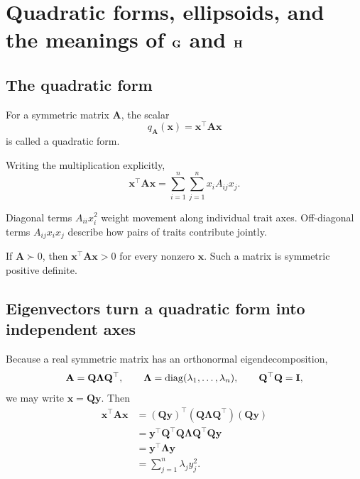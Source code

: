 \chapter{Quadratic forms, ellipsoids, and the meanings of \(\mathbf{G}\) and \(\mathbf{H}\)}

\section{The quadratic form}

For a symmetric matrix \(\mathbf A\), the scalar
\begin{equation}
q_{\mathbf A}(\mathbf x)=\mathbf x^\top\mathbf A\mathbf x
\end{equation}
is called a quadratic form.

Writing the multiplication explicitly,
\begin{equation}
\mathbf x^\top\mathbf A\mathbf x
=\sum_{i=1}^n\sum_{j=1}^n x_iA_{ij}x_j.
\end{equation}

\inwords Diagonal terms \(A_{ii}x_i^2\) weight movement along individual trait axes. Off-diagonal terms \(A_{ij}x_ix_j\) describe how pairs of traits contribute jointly.

If \(\mathbf A\succ0\), then \(\mathbf x^\top\mathbf A\mathbf x>0\) for every nonzero \(\mathbf x\). Such a matrix is symmetric positive definite.

\section{Eigenvectors turn a quadratic form into independent axes}

Because a real symmetric matrix has an orthonormal eigendecomposition,
\begin{equation}
\mathbf A=\mathbf Q\boldsymbol\Lambda\mathbf Q^\top,
\qquad
\boldsymbol\Lambda=\operatorname{diag}(\lambda_1,\ldots,\lambda_n),
\qquad
\mathbf Q^\top\mathbf Q=\mathbf{I},
\end{equation}
we may write \(\mathbf x=\mathbf Q\mathbf y\). Then
\begin{align}
\mathbf x^\top\mathbf A\mathbf x
&=(\mathbf Q\mathbf y)^\top
(\mathbf Q\boldsymbol\Lambda\mathbf Q^\top)
(\mathbf Q\mathbf y)\\
&=\mathbf y^\top\mathbf Q^\top\mathbf Q
\boldsymbol\Lambda
\mathbf Q^\top\mathbf Q\mathbf y\\
&=\mathbf y^\top\boldsymbol\Lambda\mathbf y\\
&=\sum_{j=1}^n\lambda_jy_j^2.
\label{eq:quadDiagonal}
\end{align}

